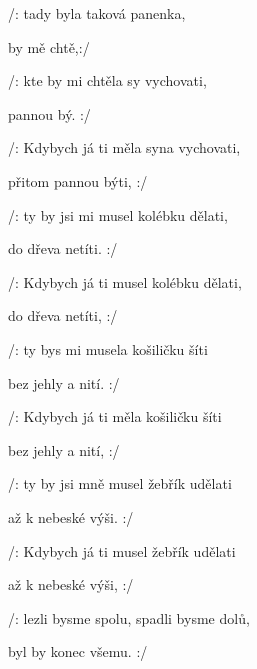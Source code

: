 

\zs
/:  tady byla taková panenka,

 by mě chtě,:/

/: kte by mi chtěla sy vychovati,

 pannou bý. :/
\ks

\zs
/: Kdybych já ti měla syna vychovati,

přitom pannou býti, :/

/: ty by jsi mi musel kolébku dělati,

do dřeva netíti. :/
\ks

\zs
/: Kdybych já ti musel kolébku dělati,

do dřeva netíti, :/

/: ty bys mi musela košiličku šíti

bez jehly a nití. :/
\ks

\zs
/: Kdybych já ti měla košiličku šíti

bez jehly a nití, :/

/: ty by jsi mně musel žebřík udělati

až k nebeské výši. :/
\ks

\zs
/: Kdybych já ti musel žebřík udělati

až k nebeské výši, :/

/: lezli bysme spolu, spadli bysme dolů,

byl by konec všemu. :/
\ks

\kp























